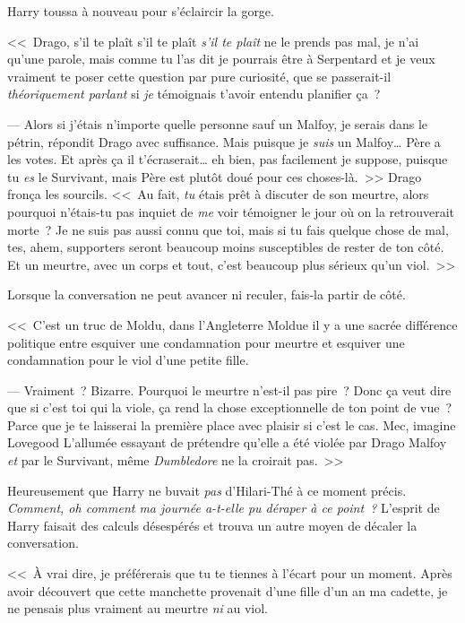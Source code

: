Harry toussa à nouveau pour s'éclaircir la gorge.

<<~Drago, s'il te plaît s'il te plaît \emph{s'il te plaît} ne le prends pas mal, je n'ai qu'une parole, mais comme tu l'as dit je pourrais être à Serpentard et je veux vraiment te poser cette question par pure curiosité, que se passerait-il \emph{théoriquement parlant} si \emph{je} témoignais t'avoir entendu planifier ça~?

--- Alors si j'étais n'importe quelle personne sauf un Malfoy, je serais dans le pétrin, répondit Drago avec suffisance. Mais puisque je \emph{suis} un Malfoy… Père a les votes. Et après ça il t'écraserait… eh bien, pas facilement je suppose, puisque tu \emph{es} le Survivant, mais Père est plutôt doué pour ces choses-là.~>> Drago fronça les sourcils. <<~Au fait, \emph{tu} étais prêt à discuter de son meurtre, alors pourquoi n'étais-tu pas inquiet de \emph{me} voir témoigner le jour où on la retrouverait morte~? Je ne suis pas aussi connu que toi, mais si tu fais quelque chose de mal, tes, ahem, supporters seront beaucoup moins susceptibles de rester de ton côté. Et un meurtre, avec un corps et tout, c'est beaucoup plus sérieux qu'un viol.~>>

Lorsque la conversation ne peut avancer ni reculer, fais-la partir de côté.

<<~C'est un truc de Moldu, dans l'Angleterre Moldue il y a une sacrée différence politique entre esquiver une condamnation pour meurtre et esquiver une condamnation pour le viol d'une petite fille.

--- Vraiment~? Bizarre. Pourquoi le meurtre n'est-il pas pire~? Donc ça veut dire que si c'est toi qui la viole, ça rend la chose exceptionnelle de ton point de vue~? Parce que je te laisserai la première place avec plaisir si c'est le cas. Mec, imagine Lovegood L'allumée essayant de prétendre qu'elle a été violée par Drago Malfoy \emph{et} par le Survivant, même \emph{Dumbledore} ne la croirait pas.~>>

Heureusement que Harry ne buvait \emph{pas} d'Hilari-Thé à ce moment précis. \emph{Comment, oh comment ma journée a-t-elle pu déraper à ce point~?} L'esprit de Harry faisait des calculs désespérés et trouva un autre moyen de décaler la conversation.

<<~À vrai dire, je préférerais que tu te tiennes à l'écart pour un moment. Après avoir découvert que cette manchette provenait d'une fille d'un an ma cadette, je ne pensais plus vraiment au meurtre \emph{ni} au viol.


